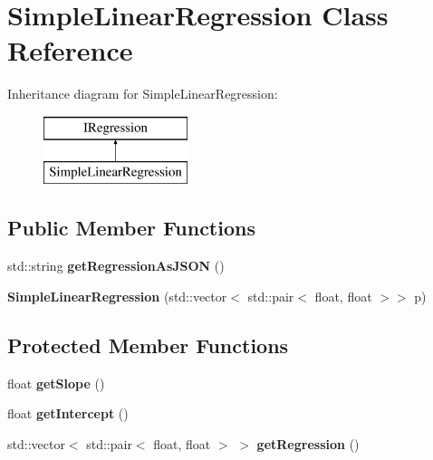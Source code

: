 \hypertarget{classSimpleLinearRegression}{}\section{Simple\+Linear\+Regression Class Reference}
\label{classSimpleLinearRegression}
Inheritance diagram for Simple\+Linear\+Regression\+:\begin{figure}[H]
\begin{center}
\leavevmode
\includegraphics[height=2.000000cm]{classSimpleLinearRegression}
\end{center}
\end{figure}
\subsection*{Public Member Functions}
\begin{DoxyCompactItemize}
\item 
\mbox{\label{classSimpleLinearRegression_a920bc4a7c09c08662ca4b44b7b2e0782}} 
std\+::string {\bfseries get\+Regression\+As\+J\+S\+ON} ()
\item 
\mbox{\label{classSimpleLinearRegression_aa37166df3d358d5c1a96b48c0f9c41af}} 
{\bfseries Simple\+Linear\+Regression} (std\+::vector$<$ std\+::pair$<$ float, float $>$$>$ p)
\end{DoxyCompactItemize}
\subsection*{Protected Member Functions}
\begin{DoxyCompactItemize}
\item 
\mbox{\label{classSimpleLinearRegression_a6e5edd1518c4b0b1d5bd6f1db30c14d4}} 
float {\bfseries get\+Slope} ()
\item 
\mbox{\label{classSimpleLinearRegression_a3b30ccdf0d57eef38aa44e98588dc14f}} 
float {\bfseries get\+Intercept} ()
\item 
\mbox{\label{classSimpleLinearRegression_ae61271a16954d19c0cc8a5d2b7006c3d}} 
std\+::vector$<$ std\+::pair$<$ float, float $>$ $>$ {\bfseries get\+Regression} ()
\end{DoxyCompactItemize}
